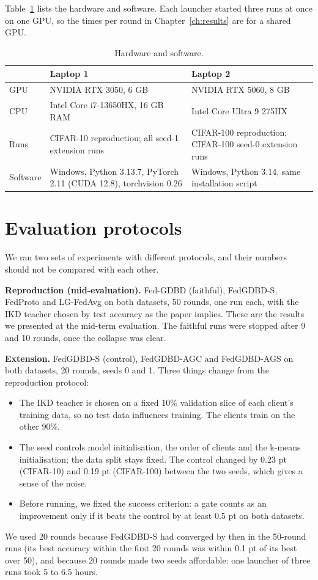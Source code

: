 Table~\ref{tab:env} lists the hardware and software. Each launcher started three runs at once on one GPU, so the times per round in Chapter~\ref{ch:results} are for a shared GPU.

\begin{table}[htbp]
\centering
\caption[Hardware and software]{Hardware and software.}
\label{tab:env}
\small
\begin{tabularx}{\textwidth}{>{\raggedright\arraybackslash}p{2.6cm}>{\raggedright\arraybackslash}X>{\raggedright\arraybackslash}X}
\toprule
 & Laptop 1 & Laptop 2 \\
\midrule
GPU & NVIDIA RTX 3050, 6 GB & NVIDIA RTX 5060, 8 GB \\
CPU & Intel Core i7-13650HX, 16 GB RAM & Intel Core Ultra 9 275HX \\
Runs & CIFAR-10 reproduction; all seed-1 extension runs & CIFAR-100 reproduction; CIFAR-100 seed-0 extension runs \\
Software & Windows, Python 3.13.7, PyTorch 2.11 (CUDA 12.8), torchvision 0.26 & Windows, Python 3.14, same installation script \\
\bottomrule
\end{tabularx}
\end{table}

\section{Evaluation protocols}
\label{sec:protocols}

We ran two sets of experiments with different protocols, and their numbers should not be compared with each other.

\textbf{Reproduction (mid-evaluation).} Fed-GDBD (faithful), FedGDBD-S, FedProto and LG-FedAvg on both datasets, 50 rounds, one run each, with the IKD teacher chosen by test accuracy as the paper implies. These are the results we presented at the mid-term evaluation. The faithful runs were stopped after 9 and 10 rounds, once the collapse was clear.

\textbf{Extension.} FedGDBD-S (control), FedGDBD-AGC and FedGDBD-AGS on both datasets, 20 rounds, seeds 0 and 1. Three things change from the reproduction protocol:
\begin{itemize}
\item The IKD teacher is chosen on a fixed 10\% validation slice of each client's training data, so no test data influences training. The clients train on the other 90\%.
\item The seed controls model initialisation, the order of clients and the k-means initialisation; the data split stays fixed. The control changed by 0.23 pt (CIFAR-10) and 0.19 pt (CIFAR-100) between the two seeds, which gives a sense of the noise.
\item Before running, we fixed the success criterion: a gate counts as an improvement only if it beats the control by at least 0.5 pt on both datasets.
\end{itemize}
We used 20 rounds because FedGDBD-S had converged by then in the 50-round runs (its best accuracy within the first 20 rounds was within 0.1 pt of its best over 50), and because 20 rounds made two seeds affordable: one launcher of three runs took 5 to 6.5 hours.

